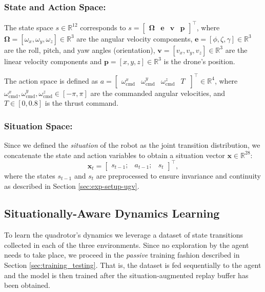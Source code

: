 \documentclass[Afour,sageh,times]{sagej}
\theoremstyle{lemma}
\begin{document}
\subsubsection{State and Action Space:} The state space $s \in \mathbb{R}^{12}$ corresponds to $s = \begin{bmatrix} \mathbf{\Omega} & \mathbf{e} & \mathbf{v} & \mathbf{p} \end{bmatrix}^\top$,
where $\mathbf{\Omega} = [\omega_x, \omega_y, \omega_z] \in \mathbb{R}^3$ are the angular velocity components, $\mathbf{e} = [\phi, \zeta, \gamma] \in \mathbb{R}^3$ are the roll, pitch, and yaw angles (orientation), $\mathbf{v} = [v_x, v_y, v_z] \in \mathbb{R}^3$ are the linear velocity components and $\mathbf{p} = [x, y, z]\in \mathbb{R}^3$ is the drone's position.

The action space is defined as $a = \begin{bmatrix} \omega^x_{\text{cmd}} & \omega^y_{\text{cmd}} & \omega^z_{\text{cmd}} & T\ \end{bmatrix}^\top \in \mathbb{R}^4$, where $\omega^x_{\text{cmd}}, \omega^y_{\text{cmd}}, \omega^z_{\text{cmd}} \in [-\pi, \pi]$ are the commanded angular velocities, and $T \in [0, 0.8]$ is the thrust command.

\subsubsection{Situation Space:}  
Since we defined the \textit{situation} of the robot as the joint transition distribution, we concatenate the state and action variables to obtain a situation vector $\mathbf{x} \in \mathbb{R}^{28}$:
\begin{equation} \label{eq:situation-space-quadx}
    \mathbf{x}_t = \begin{bmatrix} s_{t-1}; & a_{t-1}; & s_t \end{bmatrix}^\top,
\end{equation}
where the states $s_{t-1}$ and $s_t$ are preprocessed to ensure invariance and continuity as described in Section \ref{sec:exp-setup-ugv}.


\subsection{Situationally-Aware Dynamics Learning}   \label{subsec:results-training-quadx}

To learn the quadrotor's dynamics we leverage a dataset of state transitions collected in each of the three environments. Since no exploration by the agent needs to take place, we proceed in the \textit{passive} training fashion described in Section \ref{sec:training_testing}. That is, the dataset is fed sequentially to the agent and the model is then trained after the situation-augmented replay buffer has been obtained.
\end{document}
